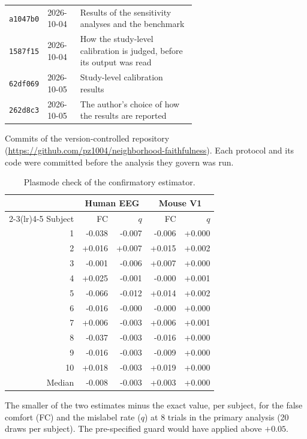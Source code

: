 \documentclass[11pt]{article}
\newcommand{\tablenote}[1]{\par\smallskip\noindent
  \begin{minipage}{\linewidth}\footnotesize\setlength{\parindent}{0pt}#1\end{minipage}}
\begin{document}
\begin{table}[!htb]
\begin{tabular}{llp{0.62\linewidth}}
\texttt{a1047b0} & 2026-10-04 & Results of the sensitivity analyses and the benchmark \\
\texttt{1587f15} & 2026-10-04 & How the study-level calibration is judged, before its output was read \\
\texttt{62df069} & 2026-10-05 & Study-level calibration results \\
\texttt{262d8c3} & 2026-10-05 & The author's choice of how the results are reported \\
\bottomrule
\end{tabular}
\tablenote{Commits of the version-controlled repository (\url{https://github.com/pz1004/neighborhood-faithfulness}).
Each protocol and its code were committed before the analysis they govern was run.}
\end{table}

\begin{table}[!htb]
\centering\small
\caption{Plasmode check of the confirmatory estimator.}
\begin{tabular}{rrrrr}
\toprule
 & \multicolumn{2}{c}{Human EEG} & \multicolumn{2}{c}{Mouse V1} \\
\cmidrule(lr){2-3}\cmidrule(lr){4-5}
Subject & FC & $q$ & FC & $q$ \\
\midrule
1 & -0.038 & -0.007 & -0.006 & +0.000 \\
2 & +0.016 & +0.007 & +0.015 & +0.002 \\
3 & -0.001 & -0.006 & +0.007 & +0.000 \\
4 & +0.025 & -0.001 & -0.000 & +0.001 \\
5 & -0.066 & -0.012 & +0.014 & +0.002 \\
6 & -0.016 & -0.000 & -0.000 & +0.000 \\
7 & +0.006 & -0.003 & +0.006 & +0.001 \\
8 & -0.037 & -0.003 & -0.016 & +0.000 \\
9 & -0.016 & -0.003 & -0.009 & +0.000 \\
10 & +0.018 & -0.003 & +0.019 & +0.000 \\
\midrule
Median & -0.008 & -0.003 & +0.003 & +0.000 \\
\bottomrule
\end{tabular}
\tablenote{The smaller of the two estimates minus the exact value, per subject, for the false comfort (FC) and the mislabel rate ($q$) at 8 trials in the primary analysis (20 draws per subject).
The pre-specified guard would have applied above $+0.05$.}
\end{table}
\end{document}
